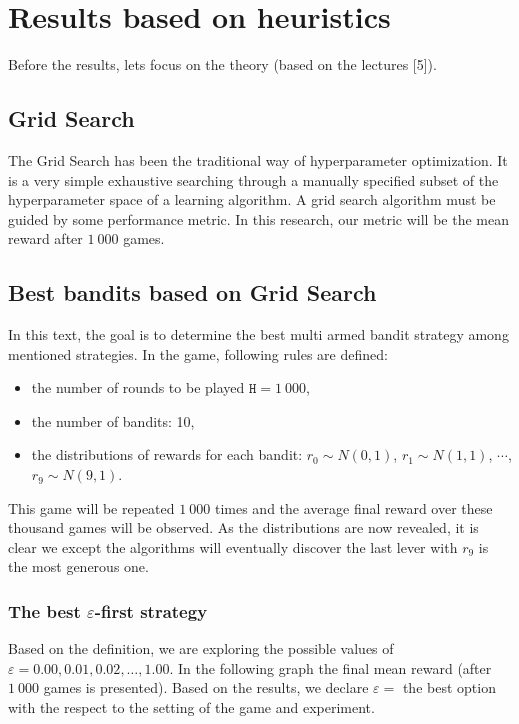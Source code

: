 \documentclass[11pt,american,czech]{article}
\begin{document}
\section*{Results based on heuristics}
Before the results, lets focus on the theory (based on the lectures [5]).

	\subsection*{Grid Search}
	The Grid Search has been the traditional way of hyperparameter optimization. It is a very simple exhaustive searching through a manually specified subset of the hyperparameter space of a learning algorithm. A grid search algorithm must be guided by some performance metric. In this research, our metric will be the mean reward after $1~000$ games. 
	
	\subsection*{Best bandits based on Grid Search}

In this text, the goal is to determine the best multi armed bandit strategy among mentioned strategies. In the game, following rules are defined:
\begin{itemize}
	\item the number of rounds to be played $\mathtt{H}=1~000$,
	\item the number of bandits: 10,
	\item the distributions of rewards for each bandit:
		\subitem $r_0\sim N(0,1)$,
		\subitem $r_1\sim N(1,1)$,
		\subitem $\cdots$,
		\subitem $r_9\sim N(9,1)$.
\end{itemize}
This game will be repeated $1~000$ times and the average final reward over these thousand games will be observed. As the distributions are now revealed, it is clear we except the algorithms will eventually discover the last lever with $r_9$ is the most generous one.

\subsubsection*{The best $\varepsilon$-first strategy}
Based on the definition, we are exploring the possible values of $\varepsilon=0.00, 0.01, 0.02,\dots, 1.00.$ In the following graph the final mean reward (after $1~000$ games is presented). Based on the results, we declare $\varepsilon = $ the best option with the respect to the setting of the game and experiment.
\end{document}
